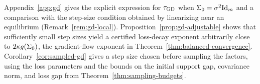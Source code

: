 Appendix~\ref{app:gd} gives the explicit expression for $\tau_{\rm GD}$ when
$\Sigma_0=\sigma^2\mathrm{Id}_m$ and a comparison with the step-size condition obtained
by linearizing near an equilibrium (Remark~\ref{rem:gd-local}).
Proposition~\ref{prop:gd-adjustable} shows that sufficiently small step sizes
yield a certified loss-decay exponent arbitrarily close to $2\kappa g(\Sigma_0)$, the gradient-flow exponent in
Theorem~\ref{thm:balanced-convergence}.
Corollary~\ref{cor:sampled-gd} gives a step size chosen before sampling the
factors, using the loss parameters and the bounds on the initial support gap,
covariance norm, and loss gap from Theorem~\ref{thm:sampling-budgets}.

